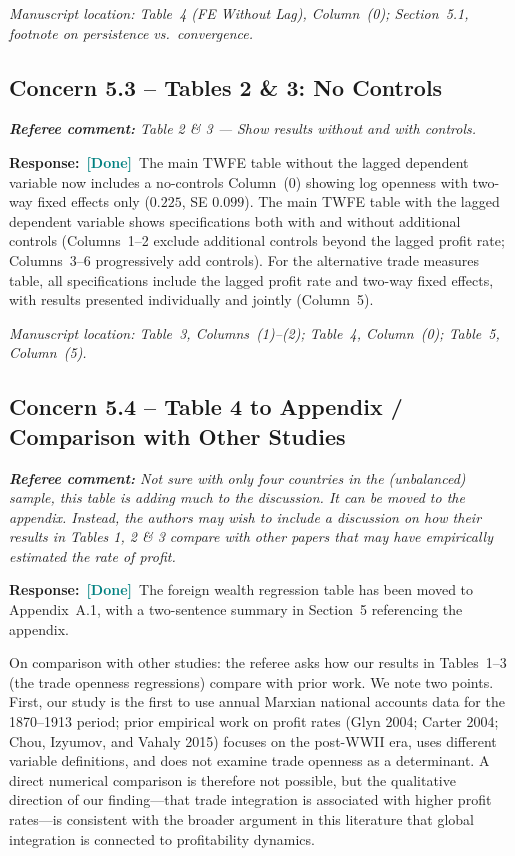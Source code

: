 \documentclass[11pt]{article}
\newcommand{\RC}[1]{\begin{refereebox}\textit{\textbf{Referee comment:} #1}\end{refereebox}}
\newcommand{\AR}{\noindent\textbf{Response:}\ }
\newcommand{\done}{\textcolor{teal}{\textbf{[Done]}}}
\begin{document}
\smallskip\noindent\textit{Manuscript location: Table~4 (FE Without Lag), Column~(0); Section~5.1, footnote on persistence vs.\ convergence.}

\subsection*{Concern 5.3 -- Tables 2 \& 3: No Controls}

\RC{Table 2 \& 3 --- Show results without and with controls.}

\AR \done\ The main TWFE table without the lagged dependent variable now includes a no-controls Column~(0) showing log openness with two-way fixed effects only ($0.225$, SE $0.099$). The main TWFE table with the lagged dependent variable shows specifications both with and without additional controls (Columns~1--2 exclude additional controls beyond the lagged profit rate; Columns~3--6 progressively add controls). For the alternative trade measures table, all specifications include the lagged profit rate and two-way fixed effects, with results presented individually and jointly (Column~5).

\smallskip\noindent\textit{Manuscript location: Table~3, Columns~(1)--(2); Table~4, Column~(0); Table~5, Column~(5).}

\subsection*{Concern 5.4 -- Table 4 to Appendix / Comparison with Other Studies}

\RC{Not sure with only four countries in the (unbalanced) sample, this table is adding much to the discussion. It can be moved to the appendix. Instead, the authors may wish to include a discussion on how their results in Tables 1, 2 \& 3 compare with other papers that may have empirically estimated the rate of profit.}

\AR \done\ The foreign wealth regression table has been moved to Appendix~A.1, with a two-sentence summary in Section~5 referencing the appendix.

On comparison with other studies: the referee asks how our results in Tables~1--3 (the trade openness regressions) compare with prior work. We note two points. First, our study is the first to use annual Marxian national accounts data for the 1870--1913 period; prior empirical work on profit rates (Glyn 2004; Carter 2004; Chou, Izyumov, and Vahaly 2015) focuses on the post-WWII era, uses different variable definitions, and does not examine trade openness as a determinant. A direct numerical comparison is therefore not possible, but the qualitative direction of our finding---that trade integration is associated with higher profit rates---is consistent with the broader argument in this literature that global integration is connected to profitability dynamics.
\end{document}
